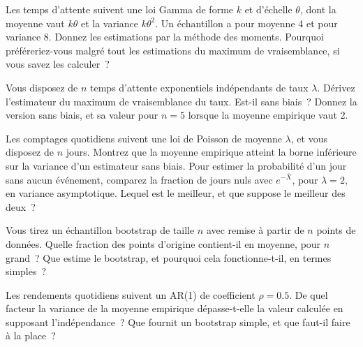 \begin{question}\label{iq:iv1:statistics:15}
Les temps d'attente suivent une loi Gamma de forme $k$ et d'échelle $\theta$, dont la moyenne vaut $k\theta$ et la variance $k\theta^2$. Un échantillon a pour moyenne 4 et pour variance 8. Donnez les estimations par la méthode des moments. Pourquoi préféreriez-vous malgré tout les estimations du maximum de vraisemblance, si vous savez les calculer~?
\end{question}

\begin{question}\label{iq:iv1:statistics:16}
Vous disposez de $n$ temps d'attente exponentiels indépendants de taux $\lambda$. Dérivez l'estimateur du maximum de vraisemblance du taux. Est-il sans biais~? Donnez la version sans biais, et sa valeur pour $n = 5$ lorsque la moyenne empirique vaut 2.
\end{question}

\begin{question}\label{iq:iv1:statistics:17}
Les comptages quotidiens suivent une loi de Poisson de moyenne $\lambda$, et vous disposez de $n$ jours. Montrez que la moyenne empirique atteint la borne inférieure sur la variance d'un estimateur sans biais. Pour estimer la probabilité d'un jour sans aucun événement, comparez la fraction de jours nuls avec $e^{-\bar{X}}$, pour $\lambda = 2$, en variance asymptotique. Lequel est le meilleur, et que suppose le meilleur des deux~?
\end{question}

\begin{question}\label{iq:iv1:statistics:18}
Vous tirez un échantillon bootstrap de taille $n$ avec remise à partir de $n$ points de données. Quelle fraction des points d'origine contient-il en moyenne, pour $n$ grand~? Que estime le bootstrap, et pourquoi cela fonctionne-t-il, en termes simples~?
\end{question}

\begin{question}\label{iq:iv1:statistics:19}
Les rendements quotidiens suivent un AR(1) de coefficient $\rho = 0.5$. De quel facteur la variance de la moyenne empirique dépasse-t-elle la valeur calculée en supposant l'indépendance~? Que fournit un bootstrap simple, et que faut-il faire à la place~?
\end{question}


